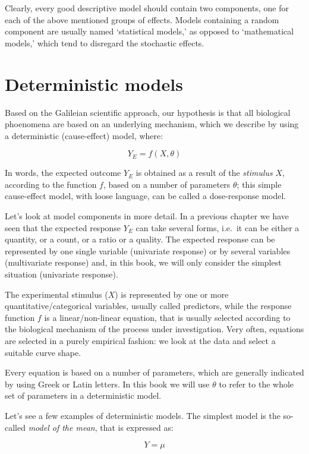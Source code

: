 \documentclass[a4paper,12pt,oneside]{book}
\begin{document}
Clearly, every good descriptive model should contain two components, one for each of the above mentioned groups of effects. Models containing a random component are usually named `statistical models,' as opposed to `mathematical models,' which tend to disregard the stochastic effects.

\hypertarget{deterministic-models}{%
\section{Deterministic models}\label{deterministic-models}}

Based on the Galileian scientific approach, our hypothesis is that all biological phoenomena are based on an underlying mechanism, which we describe by using a deterministic (cause-effect) model, where:

\[ Y_E = f(X, \theta) \]

In words, the expected outcome \(Y_E\) is obtained as a result of the \emph{stimulus} \(X\), according to the function \(f\), based on a number of parameters \(\theta\); this simple cause-effect model, with loose language, can be called a dose-response model.

Let's look at model components in more detail. In a previous chapter we have seen that the expected response \(Y_E\) can take several forms, i.e.~it can be either a quantity, or a count, or a ratio or a quality. The expected response can be represented by one single variable (univariate response) or by several variables (multivariate response) and, in this book, we will only consider the simplest situation (univariate response).

The experimental stimulus (\(X\)) is represented by one or more quantitative/categorical variables, usually called predictors, while the response function \(f\) is a linear/non-linear equation, that is usually selected according to the biological mechanism of the process under investigation. Very often, equations are selected in a purely empirical fashion: we look at the data and select a suitable curve shape.

Every equation is based on a number of parameters, which are generally indicated by using Greek or Latin letters. In this book we will use \(\theta\) to refer to the whole set of parameters in a deterministic model.

Let's see a few examples of deterministic models. The simplest model is the so-called \emph{model of the mean}, that is expressed as:

\[ Y = \mu \]
\end{document}
